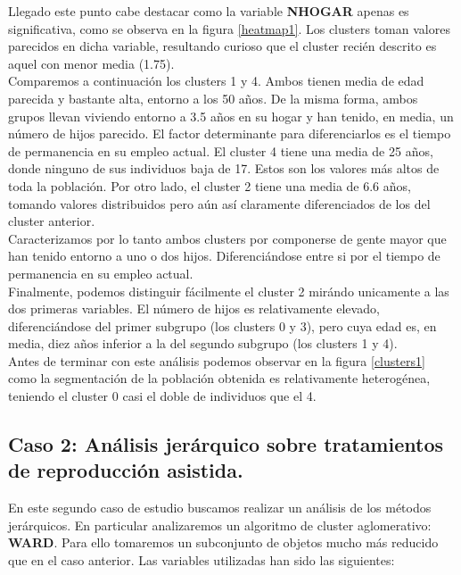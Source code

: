 \documentclass[11pt,a4paper]{article}
\begin{document}
	Llegado este punto cabe destacar como la variable \textbf{NHOGAR} apenas es significativa, como se observa en la figura \ref{heatmap1}. Los clusters toman valores parecidos en dicha variable, resultando curioso que el cluster recién descrito es aquel con menor media (1.75). \\
	
	Comparemos a continuación los clusters 1 y 4. Ambos tienen media de edad parecida y bastante alta, entorno a los 50 años. De la misma forma, ambos grupos llevan viviendo entorno a 3.5 años en su hogar y han tenido, en media, un número de hijos parecido. El factor determinante para diferenciarlos es el tiempo de permanencia en su empleo actual. El cluster 4 tiene una media de 25 años, donde ninguno de sus individuos baja de 17. Estos son los valores más altos de toda la población. Por otro lado, el cluster 2 tiene una media de 6.6 años, tomando valores distribuidos pero aún así claramente diferenciados de los del cluster anterior. \\
	
	Caracterizamos por lo tanto ambos clusters por componerse de gente mayor que han tenido entorno a uno o dos hijos. Diferenciándose entre si por el tiempo de permanencia en su empleo actual. \\
	
	Finalmente, podemos distinguir fácilmente el cluster 2 mirándo unicamente a las dos primeras variables. El número de hijos es relativamente elevado, diferenciándose del primer subgrupo (los clusters 0 y 3), pero cuya edad es, en media, diez años inferior a la del segundo subgrupo (los clusters 1 y 4). \\

	Antes de terminar con este análisis podemos observar en la figura \ref{clusters1} como la segmentación de la población obtenida es relativamente heterogénea, teniendo el cluster 0 casi el doble de individuos que el 4. \\	
	
	\subsection{Caso 2: Análisis jerárquico sobre tratamientos de reproducción asistida. }
	
	En este segundo caso de estudio buscamos realizar un análisis de los métodos jerárquicos. En particular analizaremos un algoritmo de cluster aglomerativo: \textbf{WARD}. Para ello tomaremos un subconjunto de objetos mucho más reducido que en el caso anterior. Las variables utilizadas han sido las siguientes:
\end{document}
